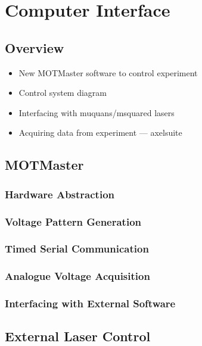 \chapter{Computer Interface}\label{chap:compinterface}
\section{Overview}\label{sec:compinterface_overview}
\begin{itemize}
    \item New MOTMaster software to control experiment
    \item Control system diagram
    \item Interfacing with muquans/msquared lasers
    \item Acquiring data from experiment --- axelsuite
\end{itemize}

\section{MOTMaster}\label{sec:compinterface_motmaster}
\subsection{Hardware Abstraction}\label{subsec:compinterface_hwabstraction}
\subsection{Voltage Pattern Generation}\label{subsec:compinterface_patterngen}
\subsection{Timed Serial Communication}\label{subsec:compinterface_serial}
\subsection{Analogue Voltage Acquisition}\label{subsec:compinterface_mmacquisition}
\subsection{Interfacing with External Software}\label{subsec:compinterface_extsofware}

\section{External Laser Control}\label{sec:compinterface_lasercontrol}
